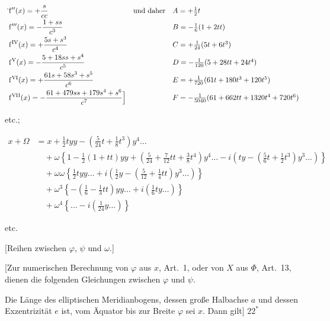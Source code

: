 \[
\begin{array}{ll@{\quad}l}
\displaystyle\rlap{\hspace{-.3em}\raisebox{1.2ex}{.}}\mathrm f''(x)=+\frac{s}{cc}&\text{und daher}&A=+\tfrac12t\\[6pt]
\displaystyle\mathrm f'''(x)=-\frac{1+ss}{c^3}&&B=-\tfrac16(1+2tt)\\[6pt]
\displaystyle\mathrm f^{\mathrm{IV}}(x)=+\frac{5s+s^3}{c^4}&&C=+\tfrac1{24}(5t+6t^3)\\[6pt]
\displaystyle\mathrm f^{\mathrm V}(x)=-\frac{5+18ss+s^4}{c^5}&&D=-\tfrac1{120}(5+28tt+24t^4)\\[6pt]
\displaystyle\mathrm f^{\mathrm{VI}}(x)=+\frac{61s+58s^3+s^5}{c^6}&&E=+\tfrac1{720}(61t+180t^3+120t^5)\\[6pt]
\displaystyle\mathrm f^{\mathrm{VII}}(x)=-\frac{61+479ss+179s^4+s^6}{c^7}\Big]&&F=-\tfrac1{5040}(61+662tt+1320t^4+720t^6)
\end{array}
\]
\begin{center}etc.;\end{center}
\par{}
\begingroup\footnotesize
\[
\begin{aligned}
x+\Omega&=x+\tfrac12tyy-(\tfrac5{24}t+\tfrac18t^3)y^4\ldots\\
&\quad+\omega\left\{1-\tfrac12(1+tt)yy+(\tfrac5{24}+\tfrac7{12}tt+\tfrac38t^4)y^4\ldots-i\left(ty-(\tfrac56t+\tfrac12t^3)y^3\ldots\right)\right\}\\
&\quad+\omega\omega\left\{\tfrac12tyy\ldots+i\left(\tfrac12y-(\tfrac5{12}+\tfrac14tt)y^3\ldots\right)\right\}\\
&\quad+\omega^3\left\{-(\tfrac16-\tfrac13tt)yy\ldots+i(\tfrac16ty\ldots)\right\}\\
&\quad+\omega^4\left\{\ldots-i(\tfrac1{24}y\ldots)\right\}
\end{aligned}
\]
\begin{center}etc.\end{center}
\par\endgroup
\bigskip
\begin{center}
[Reihen zwischen $\varphi$, $\psi$ und $\omega$.]\par\medskip
[21.]
\end{center}
[Zur numerischen Berechnung von $\varphi$ aus $x$, Art.~1, oder von $X$ aus $\Phi$, Art.~13, dienen die folgenden Gleichungen zwischen $\varphi$ und $\psi$.

Die Länge des elliptischen Meridianbogens, dessen große Halbachse $a$ und dessen Exzentrizität $e$ ist, vom Äquator bis zur Breite $\varphi$ sei $x$. Dann gilt]
\vfill\hfill$22^*$\hspace*{2cm}\par
\endgroup
